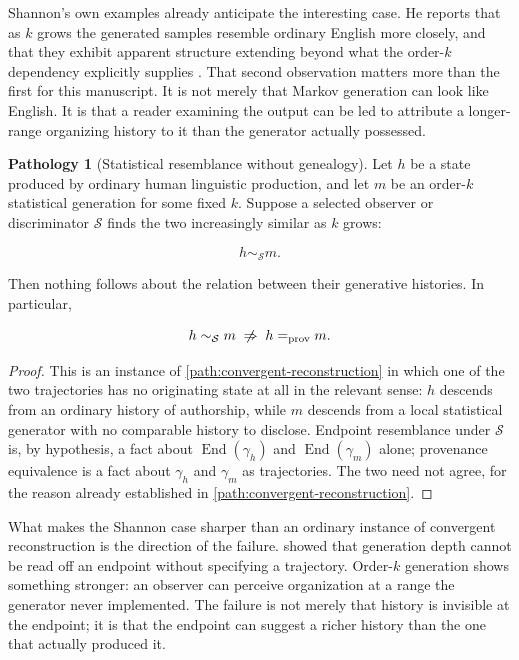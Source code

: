 \documentclass[
  11pt,
  a4paper,
  DIV=12,
  BCOR=0mm,
  parskip=half-
]{scrartcl}
\newcommand{\eqprov}{=_{\mathrm{prov}}}
\newcommand{\End}{\operatorname{End}}
\newcommand{\nimplies}{%
  \centernot\Rightarrow
}
\theoremstyle{definition}
\newtheorem{pathology}[definition]{Pathology}
\theoremstyle{plain}
\theoremstyle{remark}
\begin{document}
Shannon's own examples already anticipate the interesting case. He reports
that as \(k\) grows the generated samples resemble ordinary English more
closely, and that they exhibit apparent structure extending beyond what the
order-\(k\) dependency explicitly supplies \cite{shannon1948}. That second
observation matters more than the first for this manuscript. It is not
merely that Markov generation can look like English. It is that a reader
examining the output can be led to attribute a longer-range organizing
history to it than the generator actually possessed.

\begin{pathology}[Statistical resemblance without genealogy]
\label{path:shannon-resemblance}
Let \(h\) be a state produced by ordinary human linguistic production, and
let \(m\) be an order-\(k\) statistical generation for some fixed \(k\).
Suppose a selected observer or discriminator \(\mathcal S\) finds the two
increasingly similar as \(k\) grows:

\[
  h\sim_{\mathcal S}m.
\]

Then nothing follows about the relation between their generative histories.
In particular,

\[
  h\sim_{\mathcal S}m
  \;\nimplies\;
  h\eqprov m.
\]
\end{pathology}

\begin{proof}
This is an instance of \cref{path:convergent-reconstruction} in which one of
the two trajectories has no originating state at all in the relevant sense:
\(h\) descends from an ordinary history of authorship, while \(m\) descends
from a local statistical generator with no comparable history to disclose.
Endpoint resemblance under \(\mathcal S\) is, by hypothesis, a fact about
\(\End(\gamma_h)\) and \(\End(\gamma_m)\) alone; provenance equivalence is a
fact about \(\gamma_h\) and \(\gamma_m\) as trajectories. The two need not
agree, for the reason already established in
\cref{path:convergent-reconstruction}.
\end{proof}

What makes the Shannon case sharper than an ordinary instance of convergent
reconstruction is the direction of the failure.  showed
that generation depth cannot be read off an endpoint without specifying a
trajectory. Order-\(k\) generation shows something stronger: an observer can
perceive organization at a range the generator never implemented. The
failure is not merely that history is invisible at the endpoint; it is that
the endpoint can suggest a richer history than the one that actually
produced it.
\end{document}
